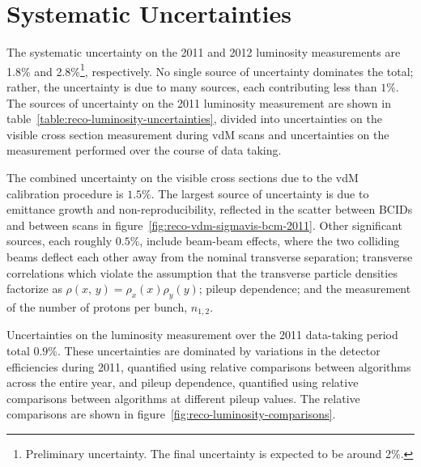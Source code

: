 \section{Systematic Uncertainties}\label{sec:reco-luminosity-uncertainties}
The systematic uncertainty on the 2011 and 2012 luminosity measurements are 1.8\% and 2.8\%\footnote{Preliminary uncertainty. The final uncertainty is expected to be around 2\%.}, respectively. No single source of uncertainty dominates the total; rather, the uncertainty is due to many sources, each contributing less than $1\%$. The sources of uncertainty on the 2011 luminosity measurement are shown in table~\ref{table:reco-luminosity-uncertainties}, divided into uncertainties on the visible cross section measurement during vdM scans and uncertainties on the measurement performed over the course of data taking. 

The combined uncertainty on the visible cross sections due to the vdM calibration procedure is $1.5\%$. The largest source of uncertainty is due to emittance growth and non-reproducibility, reflected in the scatter between BCIDs and between scans in figure~\ref{fig:reco-vdm-sigmavis-bcm-2011}. Other significant sources, each roughly $0.5\%$, include beam-beam effects, where the two colliding beams deflect each other away from the nominal transverse separation; transverse correlations which violate the assumption that the transverse particle densities factorize as $\rho(x,\,y)=\rho_x(x)\rho_y(y)$; pileup dependence; and the measurement of the number of protons per bunch, $n_{1,2}$. 

Uncertainties on the luminosity measurement over the 2011 data-taking period total $0.9\%$. These uncertainties are dominated by variations in the detector efficiencies during 2011, quantified using relative comparisons between algorithms across the entire year, and pileup dependence, quantified using relative comparisons between algorithms at different pileup values. The relative comparisons are shown in figure~\ref{fig:reco-luminosity-comparisons}.


